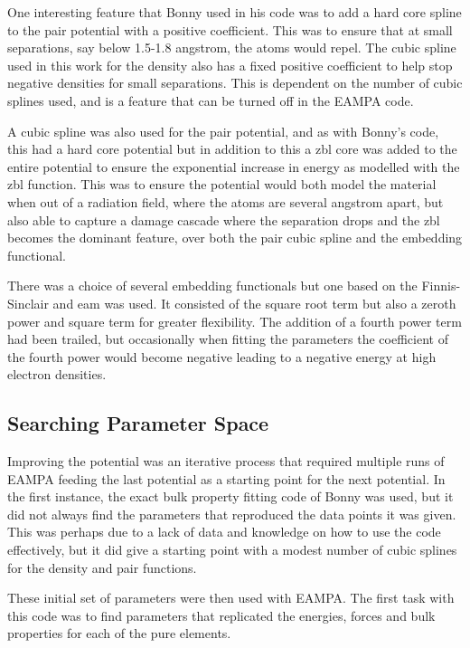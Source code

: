 One interesting feature that Bonny used in his code was to add a hard core spline to the pair potential with a positive coefficient.  This was to ensure that at small separations, say below 1.5-1.8 angstrom, the atoms would repel.  The cubic spline used in this work for the density also has a fixed positive coefficient to help stop negative densities for small separations.  This is dependent on the number of cubic splines used, and is a feature that can be turned off in the EAMPA code.

A cubic spline was also used for the pair potential, and as with Bonny's code, this had a hard core potential but in addition to this a \acrshort{zbl} core was added to the entire potential to ensure the exponential increase in energy as modelled with the \acrshort{zbl} function.  This was to ensure the potential would both model the material when out of a radiation field, where the atoms are several angstrom apart, but also able to capture a damage cascade where the separation drops and the \acrshort{zbl} becomes the dominant feature, over both the pair cubic spline and the embedding functional.

There was a choice of several embedding functionals but one based on the Finnis-Sinclair and \acrshort{eam} was used.  It consisted of the square root term but also a zeroth power and square term for greater flexibility.  The addition of a fourth power term had been trailed, but occasionally when fitting the parameters the coefficient of the fourth power would become negative leading to a negative energy at high electron densities.


\subsection{Searching Parameter Space}

Improving the potential was an iterative process that required multiple runs of EAMPA feeding the last potential as a starting point for the next potential.  In the first instance, the exact bulk property fitting code of Bonny was used, but it did not always find the parameters that reproduced the data points it was given.  This was perhaps due to a lack of data and knowledge on how to use the code effectively, but it did give a starting point with a modest number of cubic splines for the density and pair functions.

These initial set of parameters were then used with EAMPA.  The first task with this code was to find parameters that replicated the energies, forces and bulk properties for each of the pure elements.

